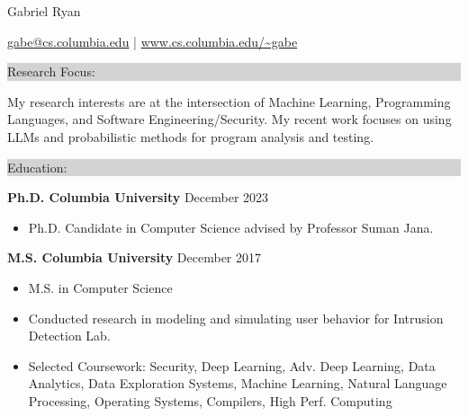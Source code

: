 \documentclass{article} %
\newcommand{\rsection}[1]{
  \hspace{-0.4cm}\vspace{0.1cm}
\colorbox{lightgrey}{
\begin{minipage}{1.07\linewidth}
\vspace{0.22cm}
\fontsize{14pt}{16pt}\selectfont #1
\vspace{0.12cm}
\end{minipage}
}
\vspace*{-0.1cm}
}
\newcommand{\rjob}[2]{
  \hspace*{-0.3cm}
{\fontsize{10pt}{12pt}\selectfont #1} \hfill #2
\vspace*{0.1cm}
\hspace*{-1.2cm}
}
\newenvironment{ritemize}{
\hspace*{-0.8cm}
\begin{minipage}{1.05\linewidth}
\begin{itemize}
}{
\end{itemize}
\end{minipage}
}
\newcommand{\ritem}{
\item[-]
}
\begin{document}
\hspace*{-0.45cm}
{\fontsize{22pt}{22pt}\selectfont Gabriel Ryan}\\
\begin{minipage}{\linewidth}
\vspace{0.1cm}
  {\fontsize{12}{12}\selectfont
      \href{mailto:gabe@cs.columbia.edu}{gabe@cs.columbia.edu} | \url{www.cs.columbia.edu/~gabe}
  }
\end{minipage}
\vspace{-0.15cm}

\rsection{Research Focus:}

My research interests are at the intersection of Machine Learning, Programming Languages, and Software Engineering/Security. My recent work focuses on using LLMs and probabilistic methods for program analysis and testing.


\rsection{Education:}

\rjob{\textbf{Ph.D. Columbia University}}{December 2023}\\
\begin{ritemize}
\ritem Ph.D. Candidate in Computer Science advised by Professor Suman Jana.
\end{ritemize}

\rjob{\textbf{M.S. Columbia University}}{December 2017}\\
\begin{ritemize}
  \ritem M.S. in Computer Science %
  \ritem Conducted research in modeling and simulating user behavior for Intrusion Detection Lab.
  \ritem Selected Coursework: Security, Deep Learning, Adv. Deep Learning, Data Analytics, Data Exploration Systems, Machine Learning, Natural Language Processing, Operating Systems, Compilers, High Perf. Computing
\end{ritemize}
\end{document}
